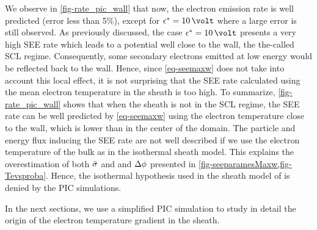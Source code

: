    We observe in \cref{fig-rate_pic_wall} that now, the electron emission rate is well predicted (error less than 5\%), except for $\crover=10\,\volt$ where a large error is still observed.
   As previously discussed, the case $\crover=10\,\volt$ presents a very high SEE rate which leads to a potential well close to the wall, the the-called \ac{SCL} regime.
   Consequently, some secondary electrons emitted at low energy would be reflected back to the wall.
   Hence, since \cref{eq-seemaxw} does not take into account this local effect, it is not surprising that the SEE rate calculated using the mean electron temperature in the sheath is too high.
   To summarize, \cref{fig-rate_pic_wall} shows that when the sheath  is not in the \ac{SCL} regime, the \ac{SEE} rate can be well predicted by \cref{eq-seemaxw} using the electron temperature close to the wall, which is lower than in the center of the domain.
   The particle and energy flux inducing the \ac{SEE} rate are not well described if we use the electron temperature of the bulk as in the isothermal sheath model.
   This explains the overestimation of both $ \bar{\sigma }$ and and $\Delta \phi$ presented in \cref{fig-seeparamesMaxw,fig-Tevsproba}.
   Hence, the isothermal hypothesis used in the sheath model of  is denied by the PIC simulations.
   
   In the next sections, we use a simplified \ac{PIC} simulation to study in detail the origin of the electron temperature gradient in the sheath.
   

